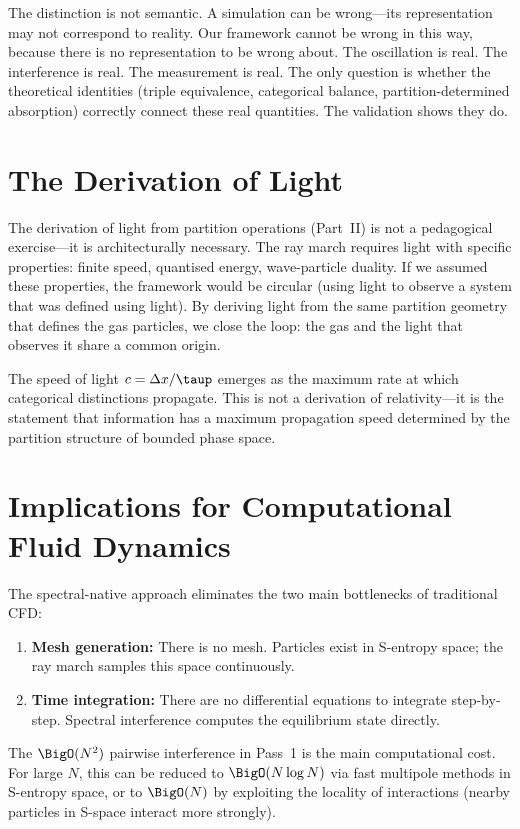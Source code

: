 The distinction is not semantic. A simulation can be wrong---its representation may not correspond to reality. Our framework cannot be wrong in this way, because there is no representation to be wrong about. The oscillation is real. The interference is real. The measurement is real. The only question is whether the theoretical identities (triple equivalence, categorical balance, partition-determined absorption) correctly connect these real quantities. The validation shows they do.

\section{The Derivation of Light}
\label{sec:light_discuss}

The derivation of light from partition operations (Part~II) is not a pedagogical exercise---it is architecturally necessary. The ray march requires light with specific properties: finite speed, quantised energy, wave-particle duality. If we assumed these properties, the framework would be circular (using light to observe a system that was defined using light). By deriving light from the same partition geometry that defines the gas particles, we close the loop: the gas and the light that observes it share a common origin.

The speed of light $c = \Delta x/\taup$ emerges as the maximum rate at which categorical distinctions propagate. This is not a derivation of relativity---it is the statement that information has a maximum propagation speed determined by the partition structure of bounded phase space.

\section{Implications for Computational Fluid Dynamics}
\label{sec:implications}

The spectral-native approach eliminates the two main bottlenecks of traditional CFD:
\begin{enumerate}
    \item \textbf{Mesh generation:} There is no mesh. Particles exist in S-entropy space; the ray march samples this space continuously.
    \item \textbf{Time integration:} There are no differential equations to integrate step-by-step. Spectral interference computes the equilibrium state directly.
\end{enumerate}

The $\BigO(N^2)$ pairwise interference in Pass~1 is the main computational cost. For large $N$, this can be reduced to $\BigO(N \log N)$ via fast multipole methods in S-entropy space, or to $\BigO(N)$ by exploiting the locality of interactions (nearby particles in S-space interact more strongly).

